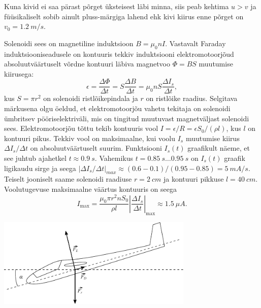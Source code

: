 \documentclass[10pt]{article}
\begin{document}
Kuna kivid ei saa pärast põrget üksteisest läbi minna, siis peab kehtima $u > v$ ja füüsikaliselt sobib ainult pluss-märgiga lahend ehk kivi kiirus enne põrget on $v_0 = \SI{1.2}{m/s}$.
\probend
\bigskip


\solu
Solenoidi sees on magnetiline induktsioon $B = \mu_0 nI$. Vastavalt Faraday induktsiooniseadusele on kontuuris tekkiv induktsiooni elektromotoorjõud absoluutväärtuselt võrdne kontuuri läbiva magnetvoo $\Phi=BS$ muutumise kiirusega:
\[
\epsilon=\frac{\Delta \Phi}{\Delta t}=S\frac{\Delta B}{\Delta t}=\mu_0 n S \frac{\Delta I_s}{\Delta t},
\]
kus $S=\pi r^2$ on solenoidi ristlõikepindala ja $r$ on ristlõike raadius. Selgitava märkusena olgu öeldud, et elektromotoorjõu vahetu tekitaja on solenoidi ümbritsev pööriselektriväli, mis on tingitud muutuvast magnetväljast solenoidi sees. Elektromotoorjõu tõttu tekib kontuuris vool $I=\epsilon/R =\epsilon S_0/(\rho l)$, kus $l$ on kontuuri pikus.
Tekkiv vool on maksimaalne, kui voolu $I_s$ muutumise kiirus $\Delta I_s/\Delta t$ on absoluutväärtuselt suurim. Funktsiooni $I_s(t)$ graafikult näeme, et see juhtub ajahetkel $t\approx \SI{0,9}{s}$. Vahemikus 
$t=\SI{0.85}{s} \ldots \SI{0.95}{s}$ on $I_s(t)$ graafik ligikaudu sirge ja seega $|\Delta I_s/\Delta t|_{max} \approx (\num{0,6}-\num{0,1})/(\num{0,95}-\num{0,85})=\SI{5}{mA/s}$. Teiselt jooniselt saame solenoidi raadiuse $r=\SI{2}{cm}$ ja kontuuri pikkuse $l=\SI{40}{cm}$. Voolutugevuse maksimaalne väärtus kontuuris on seega
\[
I_{\mathrm{max}}=\frac{\mu_0 \pi r^2 n S_0 }{\rho l}\left|\frac{\Delta I_s}{\Delta t}\right|_{\mathrm{max}}\approx \SI{1,5}{\mu A}.
\]
\probend
\bigskip

\setAuthor{}

\solu
\begin{center}
	\vspace{-30pt}
  \includegraphics[width=0.7\textwidth]{2020-v2g-05-yl.pdf}
\end{center}
\end{document}
